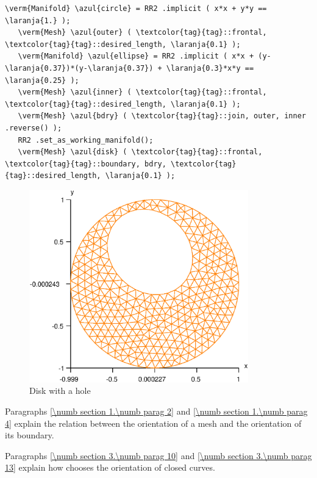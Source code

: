 \begin{Verbatim}[commandchars=\\\{\},formatcom=\small\tt,frame=single,
   label=parag-\ref{\numb section 3.\numb parag 3}.cpp,rulecolor=\color{moldura},
   baselinestretch=0.94,framesep=2mm                                            ]
   \verm{Manifold} \azul{circle} = RR2 .implicit ( x*x + y*y == \laranja{1.} );
   \verm{Mesh} \azul{outer} ( \textcolor{tag}{tag}::frontal, \textcolor{tag}{tag}::desired_length, \laranja{0.1} );
   \verm{Manifold} \azul{ellipse} = RR2 .implicit ( x*x + (y-\laranja{0.37})*(y-\laranja{0.37}) + \laranja{0.3}*x*y == \laranja{0.25} );
   \verm{Mesh} \azul{inner} ( \textcolor{tag}{tag}::frontal, \textcolor{tag}{tag}::desired_length, \laranja{0.1} );
   \verm{Mesh} \azul{bdry} ( \textcolor{tag}{tag}::join, outer, inner .reverse() );
   RR2 .set_as_working_manifold();
   \verm{Mesh} \azul{disk} ( \textcolor{tag}{tag}::frontal, \textcolor{tag}{tag}::boundary, bdry, \textcolor{tag}{tag}::desired_length, \laranja{0.1} );
\end{Verbatim}

\begin{figure}[ht] \centering
 \includegraphics[width=95mm]{disk-with-hole}
  \caption{Disk with a hole}
  \label{\numb section 3.\numb fig 2}
\end{figure}

Paragraphs \ref{\numb section 1.\numb parag 2} and \ref{\numb section 1.\numb parag 4} explain
the relation between the orientation of a mesh and the orientation of its boundary.

Paragraphs \ref{\numb section 3.\numb parag 10} and \ref{\numb section 3.\numb parag 13}
explain how {\maniFEM} chooses the orientation of closed curves.


